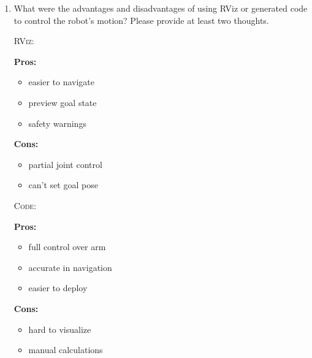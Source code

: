 \documentclass[12pt]{article}
\begin{document}
\begin{enumerate}
    \item What were the advantages and disadvantages of using RViz or generated code to control the robot's motion? Please provide at least two thoughts.
    
    \begin{multicols}{2}

        \textsc{RViz}:
        
        \textbf{Pros:}
        \begin{itemize}
            \item easier to navigate
            \item preview goal state
            \item safety warnings
        \end{itemize}
        
        \textbf{Cons:}
        \begin{itemize}
            \item partial joint control
            \item can't set goal pose
        \end{itemize}

    \columnbreak
        \textsc{Code}:
        
        \textbf{Pros:}
        \begin{itemize}
            \item full control over arm
            \item accurate in navigation
            \item easier to deploy
        \end{itemize}
        
        \textbf{Cons:}
        \begin{itemize}
            \item hard to visualize
            \item manual calculations
        \end{itemize}

    \end{multicols}

\end{enumerate}
\end{document}
